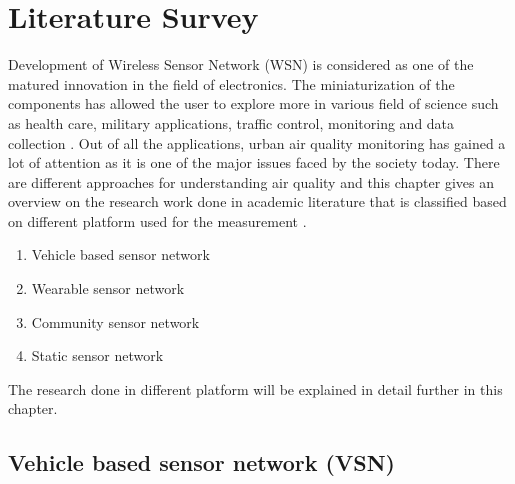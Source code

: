 \chapter{Literature Survey}

Development of Wireless Sensor Network (WSN) is considered as one of the matured innovation in the field of electronics. The miniaturization of the components has allowed the user to explore more in various field of science such as health care, military applications, traffic control, monitoring and data collection \cite{Khedo2017} \cite{Liu2017}. Out of all the applications, urban air quality monitoring has gained a lot of attention as it is one of the major issues faced by the society today. There are different approaches for understanding air quality and this chapter gives an overview on the research work done in academic literature that is classified based on different platform used for the measurement\cite{Yi2015} \cite{Pavani2017}.
 
\begin{enumerate}

    \item Vehicle based sensor network
    \item Wearable sensor network
    \item Community sensor network
    \item Static sensor network

 \end{enumerate} 

 The research done in different platform will be explained in detail further in this chapter.

\section{Vehicle based sensor network (VSN)}

